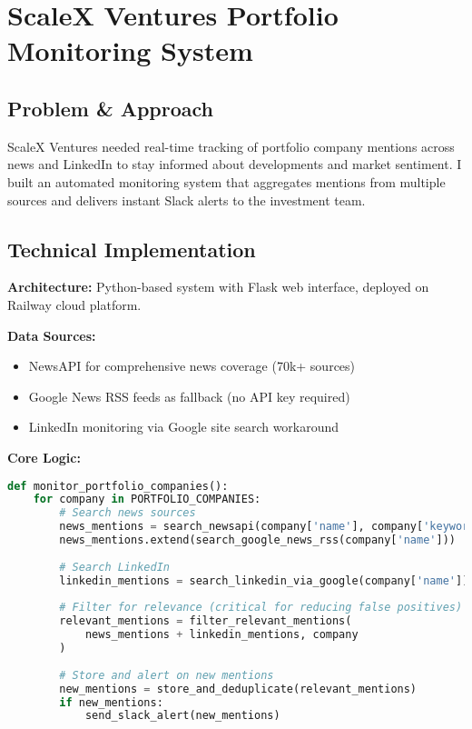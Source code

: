 \section{ScaleX Ventures Portfolio Monitoring System}

\subsection{Problem \& Approach}

ScaleX Ventures needed real-time tracking of portfolio company mentions across news and LinkedIn to stay informed about developments and market sentiment. I built an automated monitoring system that aggregates mentions from multiple sources and delivers instant Slack alerts to the investment team.

\subsection{Technical Implementation}

\textbf{Architecture:} Python-based system with Flask web interface, deployed on Railway cloud platform.

\textbf{Data Sources:}
\begin{itemize}
    \item NewsAPI for comprehensive news coverage (70k+ sources)
    \item Google News RSS feeds as fallback (no API key required)
    \item LinkedIn monitoring via Google site search workaround
\end{itemize}

\textbf{Core Logic:}
\begin{lstlisting}[language=Python]
def monitor_portfolio_companies():
    for company in PORTFOLIO_COMPANIES:
        # Search news sources
        news_mentions = search_newsapi(company['name'], company['keywords'])
        news_mentions.extend(search_google_news_rss(company['name']))
        
        # Search LinkedIn
        linkedin_mentions = search_linkedin_via_google(company['name'])
        
        # Filter for relevance (critical for reducing false positives)
        relevant_mentions = filter_relevant_mentions(
            news_mentions + linkedin_mentions, company
        )
        
        # Store and alert on new mentions
        new_mentions = store_and_deduplicate(relevant_mentions)
        if new_mentions:
            send_slack_alert(new_mentions)
\end{lstlisting}

